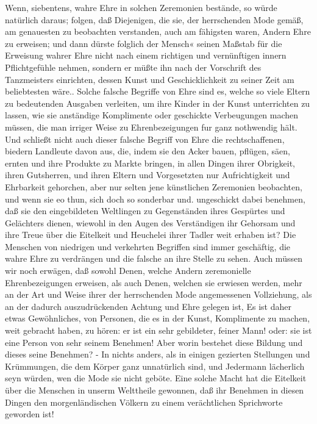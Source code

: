 Wenn, siebentens, wahre Ehre in solchen Zeremonien bestände, so würde natürlich
daraus; folgen, daß Diejenigen, die sie, der herrschenden Mode gemäß, am
genauesten zu beobachten verstanden, auch am fähigsten waren, Andern Ehre zu
erweisen; und dann dürste folglich der Mensch« seinen Maßstab für die Erweisung
wahrer Ehre nicht nach einem richtigen und vernünftigen innern Pflichtgefühle
nehmen, sondern er müßte ihn nach der Vorschrift des Tanzmeisters einrichten,
dessen Kunst und Geschicklichkeit zu seiner Zeit am beliebtesten wäre.. Solche
falsche Begriffe von Ehre sind es, welche so viele Eltern zu bedeutenden
Ausgaben verleiten, um ihre Kinder in der Kunst unterrichten zu lassen, wie sie
anständige Komplimente oder geschickte Verbeugungen machen müssen, die man
irriger Weise zu Ehrenbezeigungen fur ganz nothwendig hält. Und schließt nicht
auch dieser falsche Begriff von Ehre die rechtschaffenen, biedern Landleute
davon aus, die, indem sie den Acker bauen, pflügen, säen, ernten und ihre
Produkte zu Markte bringen, in allen Dingen ihrer Obrigkeit, ihren Gutsherren,
und ihren Eltern und Vorgesetzten nur Aufrichtigkeit und Ehrbarkeit gehorchen,
aber nur selten jene künstlichen Zeremonien beobachten, und wenn sie eo thun,
sich doch so sonderbar und. ungeschickt dabei benehmen, daß sie den
eingebildeten Weltlingen zu Gegenständen ihres Gespürtes und Gelächters dienen,
wiewohl in den Augen des Verständigen ihr Gehorsam und ihre Treue über die
Eitelkeit und Heuchelei ihrer Tadler weit erhaben ist? Die Menschen von
niedrigen und verkehrten Begriffen sind immer geschäftig, die wahre Ehre zu
verdrängen und die falsche an ihre Stelle zu sehen. Auch müssen wir noch
erwägen, daß sowohl Denen, welche Andern zeremonielle Ehrenbezeigungen erweisen,
als auch Denen, welchen sie erwiesen werden, mehr an der Art und Weise ihrer der
herrschenden Mode angemessenen Vollziehung, als an der dadurch auszudrückenden
Achtung und Ehre gelegen ist, Es ist daher etwas Gewöhnliches, von Personen, die
es in der Kunst, Komplimente zu machen, weit gebracht haben, zu hören: er ist
ein sehr gebildeter, feiner Mann! oder: sie ist eine Person von sehr seinem
Benehmen! Aber worin bestehet diese Bildung und dieses seine Benehmen? - In
nichts anders, als in einigen gezierten Stellungen und Krümmungen, die dem
Körper ganz unnatürlich sind, und Jedermann lächerlich seyn würden, wen die Mode
sie nicht geböte. Eine solche Macht hat die Eitelkeit über die Menschen in
unserm Welttheile gewonnen, daß ihr Benehmen in diesen Dingen den
morgenländischen Völkern zu einem verächtlichen Sprichworte geworden ist!

